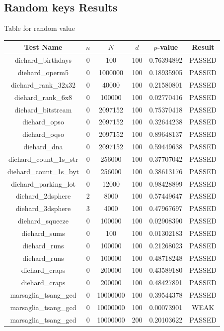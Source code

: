 \subsection{Random keys Results}
Table for random value
\begin{longtable}{cccccc}
\toprule
Test Name & $n$ & $N$ & $d$ & $p$-value & Result \\
\midrule
\endhead
diehard\_birthdays & 0 & 100 & 100 & 0.76394892 & PASSED \\
diehard\_operm5 & 0 & 1000000 & 100 & 0.18935905 & PASSED \\
diehard\_rank\_32x32 & 0 & 40000 & 100 & 0.21580801 & PASSED \\
diehard\_rank\_6x8 & 0 & 100000 & 100 & 0.02770416 & PASSED \\
diehard\_bitstream & 0 & 2097152 & 100 & 0.75370418 & PASSED \\
diehard\_opso & 0 & 2097152 & 100 & 0.32644238 & PASSED \\
diehard\_oqso & 0 & 2097152 & 100 & 0.89648137 & PASSED \\
diehard\_dna & 0 & 2097152 & 100 & 0.59449638 & PASSED \\
diehard\_count\_1s\_str & 0 & 256000 & 100 & 0.37707042 & PASSED \\
diehard\_count\_1s\_byt & 0 & 256000 & 100 & 0.38613176 & PASSED \\
diehard\_parking\_lot & 0 & 12000 & 100 & 0.98428899 & PASSED \\
diehard\_2dsphere & 2 & 8000 & 100 & 0.57449647 & PASSED \\
diehard\_3dsphere & 3 & 4000 & 100 & 0.47967697 & PASSED \\
diehard\_squeeze & 0 & 100000 & 100 & 0.02908390 & PASSED \\
diehard\_sums & 0 & 100 & 100 & 0.01302183 & PASSED \\
diehard\_runs & 0 & 100000 & 100 & 0.21268023 & PASSED \\
diehard\_runs & 0 & 100000 & 100 & 0.48718248 & PASSED \\
diehard\_craps & 0 & 200000 & 100 & 0.43589180 & PASSED \\
diehard\_craps & 0 & 200000 & 100 & 0.48427891 & PASSED \\
marsaglia\_tsang\_gcd & 0 & 10000000 & 100 & 0.39544378 & PASSED \\
marsaglia\_tsang\_gcd & 0 & 10000000 & 100 & 0.00073901 & WEAK \\
marsaglia\_tsang\_gcd & 0 & 10000000 & 200 & 0.20103622 & PASSED \\

\end{longtable}
